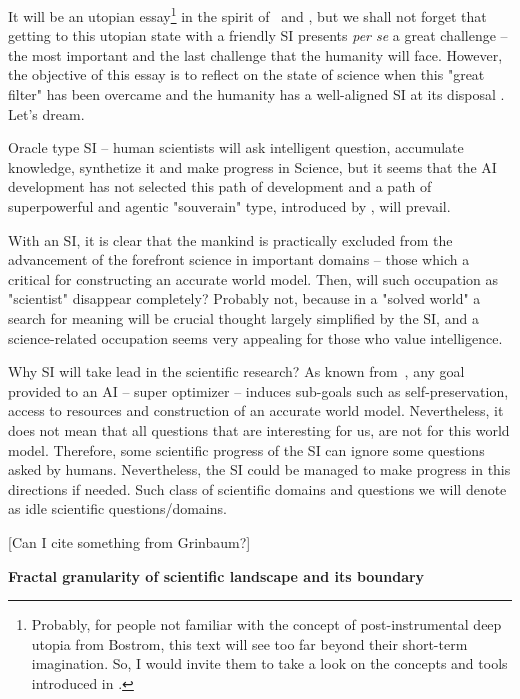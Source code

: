 \documentclass[a4paper,11pt]{article}
\begin{document}
    It will be an utopian essay\footnote{Probably, for people not familiar with the concept of post-instrumental deep utopia from Bostrom, this text will see too far beyond their short-term imagination. So, I would invite them to take a look on the concepts and tools introduced in \textcite{DeepUtopia}.} in the spirit of~\parencite{DeepUtopia} and \parencite{LovingGrace}, but we shall not forget that getting to this utopian state with a friendly SI presents \textit{per se} a great challenge -- the most important and the last challenge that the humanity will face. However, the objective of this essay is to reflect on the state of science when this "great filter" has been overcame and the humanity has a well-aligned SI at its disposal \parencite{Yudkowsky2008,Yampolskiy2016,Yudkowsky2022}. Let's dream.

    Oracle type SI -- human scientists will ask intelligent question, accumulate knowledge, synthetize it and make progress in Science, but it seems that the AI development has not selected this path of development and a path of superpowerful and agentic "souverain" type, introduced by \textcite{Bostrom2014}, will prevail.

    With an SI, it is clear that the mankind is practically excluded from the advancement of the forefront science in important domains -- those which a critical for constructing an accurate world model. Then, will such occupation as "scientist" disappear completely? Probably not, because in a "solved world" a search for meaning will be crucial thought largely simplified by the SI, and a science-related occupation seems very appealing for those who value intelligence.

    Why SI will take lead in the scientific research? As known from~\parencite{Bostrom2014,Tegmark2017}, any goal provided to an AI -- super optimizer -- induces sub-goals such as self-preservation, access to resources and construction of an accurate world model.
    Nevertheless, it does not mean that all questions that are interesting for us, are not for this world model. Therefore, some scientific progress of the SI can ignore some questions asked by humans. Nevertheless, the SI could be managed to make progress in this directions if needed. Such class of scientific domains and questions we will denote as  idle scientific questions/domains.

    [Can I cite something from Grinbaum?]

\textbf{Fractal granularity of scientific landscape and its boundary}
\end{document}
